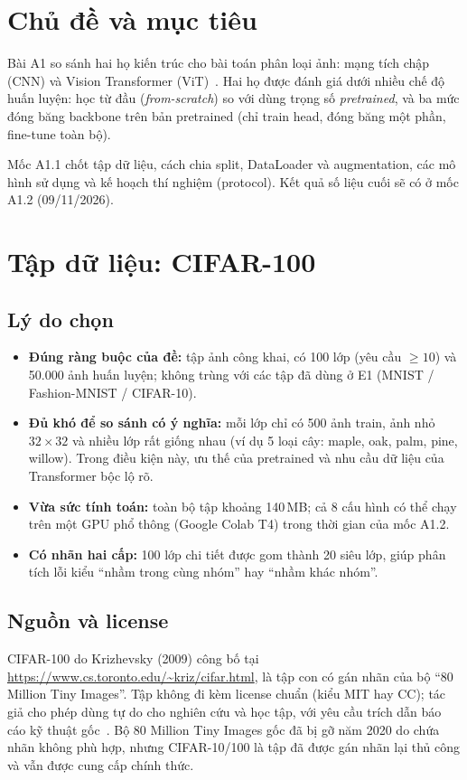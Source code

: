 \documentclass[12pt]{article}
\newcommand{\st}[1]{\textbf{#1}}
\begin{document}
\section{Chủ đề và mục tiêu}
Bài A1 so sánh hai họ kiến trúc cho bài toán phân loại ảnh: mạng tích chập (CNN) và Vision Transformer (ViT)~\cite{dosovitskiy2021}.
Hai họ được đánh giá dưới nhiều chế độ huấn luyện: học từ đầu (\emph{from-scratch}) so với dùng trọng số
\emph{pretrained}, và ba mức đóng băng backbone trên bản pretrained (chỉ train head, đóng băng một phần,
fine-tune toàn bộ).

Mốc A1.1 chốt tập dữ liệu, cách chia split, DataLoader và augmentation, các mô hình sử dụng và kế hoạch
thí nghiệm (protocol). Kết quả số liệu cuối sẽ có ở mốc A1.2 (09/11/2026).

\section{Tập dữ liệu: CIFAR-100}
\subsection{Lý do chọn}
\begin{itemize}
  \item \st{Đúng ràng buộc của đề:} tập ảnh công khai, có 100 lớp (yêu cầu $\geq 10$) và 50.000 ảnh huấn luyện;
        không trùng với các tập đã dùng ở E1 (MNIST / Fashion-MNIST / CIFAR-10).
  \item \st{Đủ khó để so sánh có ý nghĩa:} mỗi lớp chỉ có 500 ảnh train, ảnh nhỏ $32\times32$ và nhiều lớp rất giống
        nhau (ví dụ 5 loại cây: maple, oak, palm, pine, willow). Trong điều kiện này, ưu thế của pretrained và nhu cầu
        dữ liệu của Transformer bộc lộ rõ.
  \item \st{Vừa sức tính toán:} toàn bộ tập khoảng 140\,MB; cả 8 cấu hình có thể chạy trên một GPU phổ thông
        (Google Colab T4) trong thời gian của mốc A1.2.
  \item \st{Có nhãn hai cấp:} 100 lớp chi tiết được gom thành 20 siêu lớp, giúp phân tích lỗi kiểu
        ``nhầm trong cùng nhóm'' hay ``nhầm khác nhóm''.
\end{itemize}

\subsection{Nguồn và license}
CIFAR-100 do Krizhevsky (2009) công bố tại \url{https://www.cs.toronto.edu/~kriz/cifar.html}, là tập con có gán nhãn
của bộ ``80 Million Tiny Images''. Tập không đi kèm license chuẩn (kiểu MIT hay CC); tác giả cho phép dùng tự do cho
nghiên cứu và học tập, với yêu cầu trích dẫn báo cáo kỹ thuật gốc~\cite{krizhevsky2009}. Bộ 80 Million Tiny Images
gốc đã bị gỡ năm 2020 do chứa nhãn không phù hợp, nhưng CIFAR-10/100 là tập đã được gán nhãn lại thủ công và vẫn được
cung cấp chính thức.
\end{document}
